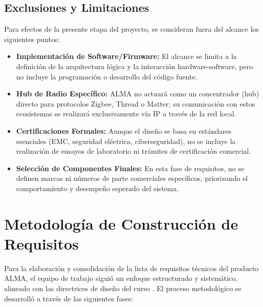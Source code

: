 \documentclass[%
	paper=a4,				%
	twoside=false,				%
	parskip=half,				%
	chapterprefix=false, 		%
	10pt,						%
	headings=normal,			%
	bibliography=totoc,			%
	listof=totoc,				%
	titlepage=on,				%
	captions=tableabove,		%
	draft=false,				%
]{scrbook}%
\begin{document}
\section{Exclusiones y Limitaciones}
Para efectos de la presente etapa del proyecto, se consideran fuera del alcance los siguientes puntos:
\begin{itemize}
    \item \textbf{Implementación de Software/Firmware:} El alcance se limita a la definición de la arquitectura lógica y la interacción hardware-software, pero no incluye la programación o desarrollo del código fuente.
    \item \textbf{Hub de Radio Específico:} ALMA no actuará como un concentrador (hub) directo para protocolos Zigbee, Thread o Matter; su comunicación con estos ecosistemas se realizará exclusivamente vía IP a través de la red local.
    \item \textbf{Certificaciones Formales:} Aunque el diseño se basa en estándares esenciales (EMC, seguridad eléctrica, ciberseguridad), no se incluye la realización de ensayos de laboratorio ni trámites de certificación comercial.
    \item \textbf{Selección de Componentes Finales:} En esta fase de requisitos, no se definen marcas ni números de parte comerciales específicos, priorizando el comportamiento y desempeño esperado del sistema.
\end{itemize}

\chapter{Metodología de Construcción de Requisitos}

Para la elaboración y consolidación de la lista de requisitos técnicos del producto ALMA, el equipo de trabajo siguió un enfoque estructurado y sistemático, alineado con las directrices de diseño del curso \cite{guia_entregable1}. El proceso metodológico se desarrolló a través de las siguientes fases:
\end{document}
